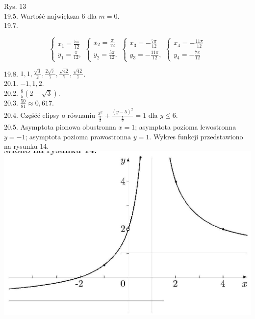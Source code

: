 \documentclass[10pt]{article}
\begin{document}
Rys. 13\\
19.5. Wartość największa 6 dla $m=0$.\\
19.7.

$$
\left\{\begin{array} { l } 
{ x _ { 1 } = \frac { 5 \pi } { 1 2 } } \\
{ y _ { 1 } = \frac { \pi } { 1 2 } , }
\end{array} \left\{\begin{array} { l } 
{ x _ { 2 } = \frac { \pi } { 1 2 } } \\
{ y _ { 2 } = \frac { 5 \pi } { 1 2 } , }
\end{array} \left\{\begin{array} { l } 
{ x _ { 3 } = - \frac { 7 \pi } { 1 2 } } \\
{ y _ { 3 } = - \frac { 1 1 \pi } { 1 2 } , }
\end{array} \left\{\begin{array}{l}
x_{4}=-\frac{11 \pi}{12} \\
y_{4}=-\frac{7 \pi}{12}
\end{array}\right.\right.\right.\right.
$$

19.8. $1,1, \frac{\sqrt{3}}{2}, \frac{2 \sqrt{7}}{7}, \frac{\sqrt{42}}{7}, \frac{\sqrt{42}}{7}$.\\
20.1. $-1,1,2$.\\
20.2. $\frac{8}{5}(2-\sqrt{3})$.\\
20.3. $\frac{50}{81} \approx 0,617$.\\
20.4. Częśćć elipsy o równaniu $\frac{x^{2}}{\frac{5}{3}}+\frac{(y-5)^{2}}{\frac{5}{2}}=1$ dla $y \leq 6$.\\
20.5. Asymptota pionowa obustronna $x=1$; asymptota pozioma lewostronna $y=-1$; asymptota pozioma prawostronna $y=1$. Wykres funkcji przedstawiono na rysunku 14.\\
\includegraphics[max width=\textwidth, center]{2024_11_16_fe5b564401bf7db98894g-068}
\end{document}

